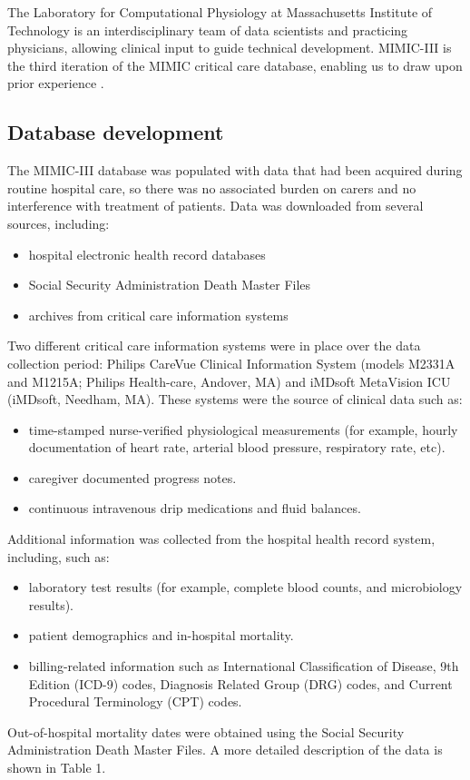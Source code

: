 \documentclass[english]{article}
\begin{document}

The Laboratory for Computational Physiology at Massachusetts Institute of Technology is an interdisciplinary team of data scientists and practicing physicians, allowing clinical input to guide technical development. MIMIC-III is the third iteration of the MIMIC critical care database, enabling us to draw upon prior experience \cite{cite3}. 

\subsection*{Database development}

The MIMIC-III database was populated with data that had been acquired during routine hospital care, so there was no associated burden on carers and no interference with treatment of patients. Data was downloaded from several sources, including:
\begin{itemize}
  \item hospital electronic health record databases
  \item Social Security Administration Death Master Files
  \item archives from critical care information systems
\end{itemize}
Two different critical care information systems were in place over the data collection period: Philips CareVue Clinical Information System (models M2331A and M1215A; Philips Health-care, Andover, MA) and iMDsoft MetaVision ICU (iMDsoft, Needham, MA). These systems were the source of clinical data such as: 
\begin{itemize}
  \item time-stamped nurse-verified physiological measurements (for example, hourly documentation of heart rate, arterial blood pressure, respiratory rate, etc).
  \item caregiver documented progress notes.
  \item continuous intravenous drip medications and fluid balances.
\end{itemize}

Additional information was collected from the hospital health record system, including, such as:
\begin{itemize}
  \item laboratory test results (for example, complete blood counts, and microbiology results).
  \item patient demographics and in-hospital mortality.
  \item billing-related information such as International Classification of Disease, 9th Edition (ICD-9) codes, Diagnosis Related Group (DRG) codes, and Current Procedural Terminology (CPT) codes.
\end{itemize}
Out-of-hospital mortality dates were obtained using the Social Security Administration Death Master Files. A more detailed description of the data is shown in Table 1. 
\end{document}
